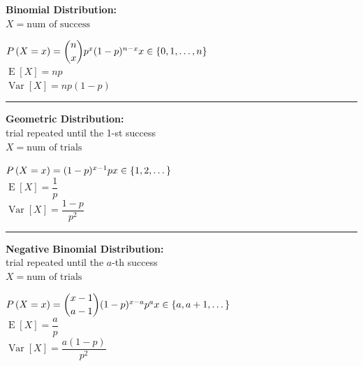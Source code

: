 \documentclass[11pt, a4paper]{article}
\newcommand{\myP}[1]{P\left(#1\right)}
\newcommand{\myPMF}[2][X]{\myP{#1 = #2}}
\newcommand{\myExpect}[1]{\operatorname{E}\left[#1\right]}
\newcommand{\myVariance}[1]{\operatorname{Var}\left[#1\right]}
\begin{document}
\noindent
\begin{minipage}[t]{0.38\textwidth}
    \textbf{Binomial Distribution:} \\[2pt]
    $X = \text{num of success}$
\end{minipage}%
\hfill
\begin{minipage}[t]{0.59\textwidth}
    $\myPMF{x} = \dbinom{n}{x} p^x (1-p)^{n-x} \hfill x \in \{0, 1, \dots, n\}$ \\[4pt]
    $\myExpect{X} = np$ \\[2pt]
    $\myVariance{X} = np(1-p)$
\end{minipage}

\vspace{5pt}
{\color{black!30}\hrule}


\noindent
\begin{minipage}[t]{0.38\textwidth}
    \textbf{Geometric Distribution:} \\[2pt]
    trial repeated until the 1-st success \\
    $X = \text{num of trials}$
\end{minipage}%
\hfill
\begin{minipage}[t]{0.59\textwidth}
    $\myPMF{x} = (1-p)^{x-1} p \hfill x \in \{1, 2, \dots\}$ \\[4pt]
    $\myExpect{X} = \dfrac{1}{p}$ \\[4pt]
    $\myVariance{X} = \dfrac{1-p}{p^2}$
\end{minipage}

\vspace{5pt}
{\color{black!30}\hrule}


\noindent
\begin{minipage}[t]{0.38\textwidth}
    \textbf{Negative Binomial Distribution:} \\[2pt]
    trial repeated until the $a$-th success \\
    $X = \text{num of trials}$
\end{minipage}%
\hfill
\begin{minipage}[t]{0.59\textwidth}
    $\myPMF{x} = \dbinom{x-1}{a-1} (1-p)^{x-a} p^a \hfill x \in \{a, a+1, \dots\}$ \\[4pt]
    $\myExpect{X} = \dfrac{a}{p}$ \\[4pt]
    $\myVariance{X} = \dfrac{a(1-p)}{p^2}$
\end{minipage}
\end{document}
